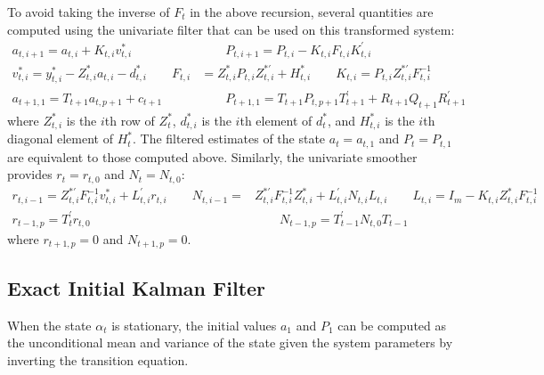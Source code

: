 \documentclass[12pt]{article}
\begin{document}
	To avoid taking the inverse of $F_t$ in the above recursion, several quantities are computed using the univariate filter that can be used on this transformed system: 
	\begin{align*}
	a_{t, i+1} = a_{t,i} + K_{t,i} v_{t,i}^* &\qquad P_{t,i+1} = P_{t,i} - K_{t,i} F_{t,i} K_{t,i}^{\prime} \\
	v_{t,i}^* = y_{t,i}^* - Z_{t,i}^* a_{t,i} - d_{t,i}^* \qquad F_{t,i} &= Z_{t,i}^* P_{t,i} Z_{t,i}^{*\prime} + H_{t,i}^* \qquad K_{t,i} = P_{t,i} Z_{t,i}^{*\prime} F_{t,i}^{-1} \\ 
	a_{t+1,1} = T_{t+1} a_{t, p+1} + c_{t+1} &\qquad P_{t+1,1} = T_{t+1} P_{t,p+1} T_{t+1}^\prime + R_{t+1} Q_{t+1} R_{t+1}^\prime
	\end{align*}
	where $Z_{t,i}^*$ is the $i$th row of $Z_t^*$, $d_{t,i}^*$ is the $i$th element of $d_t^*$, and $H_{t,i}^*$ is the $i$th diagonal element of $H_t^*$. The filtered estimates of the state $a_t = a_{t,1}$ and $P_t = P_{t,1}$ are equivalent to those computed above. Similarly, the univariate smoother provides $r_t = r_{t,0}$ and $N_t = N_{t,0}$:
	\begin{align*}
	r_{t,i-1} = Z_{t,i}^{*\prime} F_{t,i}^{-1} v_{t,i}^* + L_{t,i}^{\prime} r_{t,i} \qquad N_{t,i-1} =& Z_{t,i}^{*\prime} F_{t,i}^{-1} Z_{t,i}^* + L_{t,i}^{\prime} N_{t,i} L_{t,i} \qquad L_{t,i} = I_m - K_{t,i} Z_{t,i}^* F_{t,i}^{-1}\\
	r_{t-1,p} = T_{t}^\prime r_{t,0} &\qquad N_{t-1,p} = T_{t-1}^\prime N_{t,0} T_{t-1}
	\end{align*}
	where $r_{t+1,p} = 0$ and $N_{t+1,p} = 0$. \\

\subsection*{Exact Initial Kalman Filter}
	When the state $\alpha_t$ is stationary, the initial values $a_1$ and $P_1$ can be computed as the unconditional mean and variance of the state given the system parameters by inverting the transition equation. \\
\end{document}
